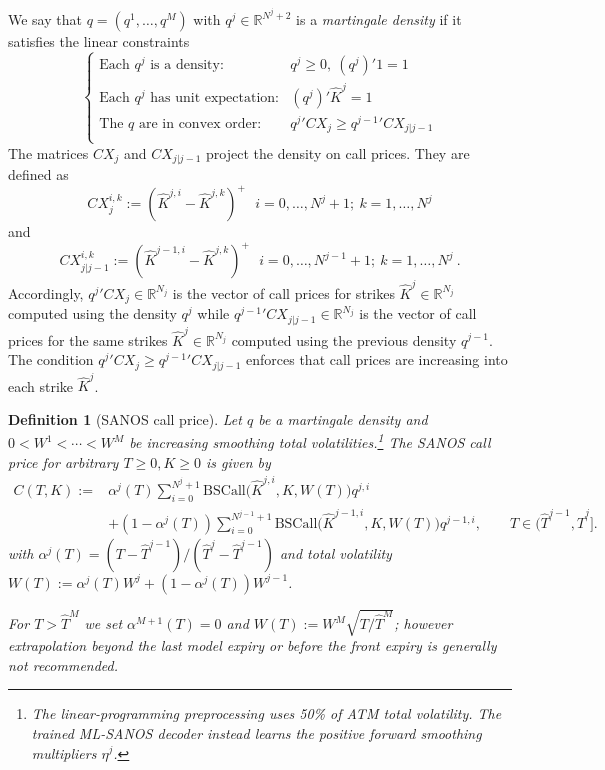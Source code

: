 \documentclass[11pt,a4paper]{article}
\newtheorem{definition}{Definition}[section]
\newcommand{\R}{\mathbb{R}}
\newcommand{\BSCall}{\mathrm{BSCall}}
\begin{document}
We say that $q=(q^1,\ldots,q^M)$ with $q^j\in\R^{N^j+2}$ is a \emph{martingale density} if
it satisfies the linear constraints
\begin{equation}\label{eq:qocnd}
    \left\{
    \begin{array}{ll}
        \mbox{Each $q^j$ is a density:} & q^j\geq 0,\ (q^j)'1 = 1 \\
        \mbox{Each $q^j$ has unit expectation:} & (q^j)' \hat K^j=1 \\
        \mbox{The $q$ are in convex order:}&
            {q^j}' CX_j \geq {q^{j-1}}' CX_{j|j-1}
            \\
    \end{array}
    \right.
\end{equation}
The matrices $CX_j$ and $CX_{j|j-1}$ project the density on call prices. They are defined as
$$
CX_j^{i,k} := (\hat K^{j,i}-\hat K^{j,k})^+ \ \ \ i=0,\ldots,N^j+1;\ k=1,\ldots,N^j
$$
and
$$
CX_{j|j-1}^{i,k} := (\hat K^{j-1,i}-\hat K^{j,k})^+ \ \ \ i=0,\ldots,N^{j-1}+1;\ k=1,\ldots,N^j  \ .
$$
Accordingly, ${q^j}' CX_j \in \R^{N_j}$ is the vector of call prices for strikes $\hat K^{j}\in\R^{N_j}$ computed using the density $q^j$
while ${q^{j-1}}' CX_{j|j-1} \in \R^{N_j}$ is the vector of call prices for the same strikes $\hat K^{j}\in\R^{N_j}$ computed using the previous density $q^{j-1}$.
The condition ${q^j}' CX_j \geq {q^{j-1}}' CX_{j|j-1}$ enforces that call prices are increasing into each strike $\hat K^{j}$.

\begin{definition}[SANOS call price]
\label{def:sanos}
Let $q$ be a martingale density and $0<W^1< \cdots < W^M$
be increasing smoothing total volatilities.\footnote{The linear-programming preprocessing uses 50\% of ATM total volatility. The trained ML-SANOS decoder instead learns the positive forward smoothing multipliers $\eta^j$.}
The SANOS call price
 for arbitrary $T\geq0 ,K\geq 0$
is given by
\begin{equation}
  \label{eq:sanos_interp}
  \begin{aligned}
  C(T,K):={}&\alpha^j(T)\sum_{i=0}^{N^j+1}
       \BSCall\!\bigl(\hat K^{j,i},K,W(T)\bigr)q^{j,i}\\
     &+(1-\alpha^j(T))\sum_{i=0}^{N^{j-1}+1}
       \BSCall\!\bigl(\hat K^{j-1,i},K,W(T)\bigr)q^{j-1,i},
       \qquad T \in (\hat T^{j-1},\hat T^j].
  \end{aligned}
\end{equation}
with $\alpha^j(T) = (T - \hat T^{j-1})/(\hat T^j - \hat T^{j-1})$
and total volatility $W(T) := \alpha^j(T) W^j + (1-\alpha^j(T)) W^{j-1}$.

For $T>\hat T^M$ we
set $\alpha^{M+1}(T)=0$ and $W(T):=W^M\sqrt{T / \hat T^M}$; however extrapolation beyond
the last model expiry or before the front expiry is generally not recommended.
\end{definition}
\end{document}
